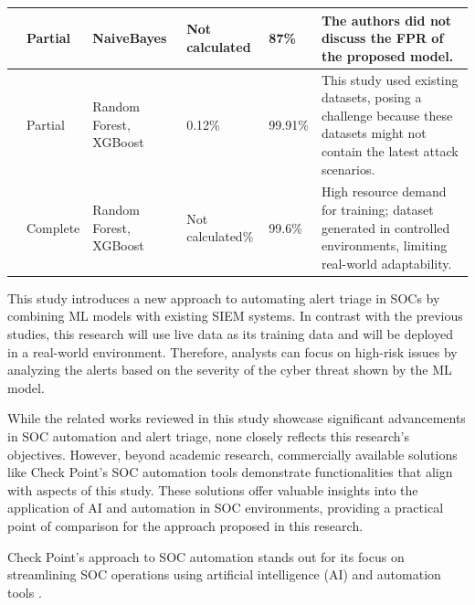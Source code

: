 \begin{longtable}{@{}P{1.9cm}P{1.9cm}P{1.9cm}P{1.9cm}P{1.9cm}P{3cm}@{}}
    \hline
    \textcite{Chandra2016} & Partial & NaiveBayes & Not calculated & 87\% & The authors did not discuss the FPR of the proposed model. \\
    \hline
    \textcite{Saini2023} & Partial & Random Forest, XGBoost & 0.12\% & 99.91\% & This study used existing datasets, posing a challenge because these datasets might not contain the latest attack scenarios. \\
    \hline
    \textcite{Ali2024} & Complete & Random Forest, XGBoost & Not calculated\% & 99.6\% & High resource demand for training; dataset generated in controlled environments, limiting real-world adaptability. \\
\end{longtable}

\normalsize

This study introduces a new approach to automating alert triage in SOCs by combining ML models with existing SIEM systems. 
In contrast with the previous studies, this research will use live data as its training data and will be deployed in a real-world environment. 
Therefore, analysts can focus on high-risk issues by analyzing the alerts based on the severity of the cyber threat shown by the ML model.

While the related works reviewed in this study showcase significant advancements in SOC automation and alert triage, none closely reflects this research's objectives. 
However, beyond academic research, commercially available solutions like Check Point's SOC automation tools demonstrate functionalities that align with aspects of this study. 
These solutions offer valuable insights into the application of AI and automation in SOC environments, providing a practical point of comparison for the approach proposed in this research.

Check Point's approach to SOC automation stands out for its focus on streamlining SOC operations using artificial intelligence (AI) and automation tools \parencite{checkpoint}.

